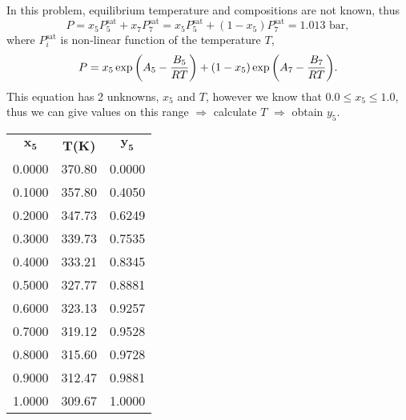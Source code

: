 \begin{enumerate}[1)]
  In this problem, equilibrium temperature and compositions are not known, thus
          \begin{displaymath}
              P = x_{5}P_{5}^{\text{sat}} + x_{7}P_{7}^{\text{sat}} = x_{5}P_{5}^{\text{sat}} + \left(1 - x_{5}\right)P_{7}^{\text{sat}} = 1.013\text{ bar},
          \end{displaymath}
          where $P_{i}^{\text{sat}}$ is non-linear function of the temperature $T$, \ie
          \begin{displaymath}
              P = x_{5}\exp{\left(A_{5} - \displaystyle\frac{B_{5}}{RT}\right)} + \left(1 - x_{5}\right)\exp{\left(A_{7} - \displaystyle\frac{B_{7}}{RT}\right)}.
          \end{displaymath}
          This equation has 2 unknowns, $x_{5}$ and $T$, however we know that $0.0\leq x_{5} \leq 1.0$, thus we can give values on this range $\Rightarrow$ calculate $T$  $\Rightarrow$  obtain $y_{5}$.
          \begin{center}
              \begin{tabular}{ c c c }
                  $\mathbf{x_{5}}$ & $\mathbf{T}${\bf(K)}  & $\mathbf{y_{5}}$ \\
                    0.0000          & 370.80                & 0.0000   \\
                    0.1000          & 357.80                & 0.4050   \\
                    0.2000          & 347.73                & 0.6249   \\
                    0.3000          & 339.73                & 0.7535   \\
                    0.4000          & 333.21                & 0.8345   \\
                    0.5000          & 327.77                & 0.8881   \\
                    0.6000          & 323.13                & 0.9257   \\
                    0.7000          & 319.12                & 0.9528   \\
                    0.8000          & 315.60                & 0.9728   \\
                    0.9000          & 312.47                & 0.9881   \\
                    1.0000          & 309.67                & 1.0000   
              \end{tabular}
           \end{center}
           

\end{enumerate}
